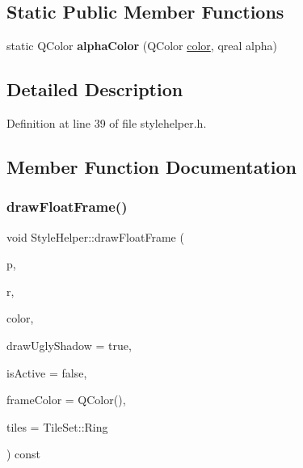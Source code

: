 \subsection*{Static Public Member Functions}
\begin{DoxyCompactItemize}
\item 
\mbox{\label{class_style_helper_a3c869e1c5e95a2c5cbdc9dc0a4b15bbd}} 
static Q\+Color {\bfseries alpha\+Color} (Q\+Color \hyperlink{structcolor}{color}, qreal alpha)
\end{DoxyCompactItemize}


\subsection{Detailed Description}


Definition at line 39 of file stylehelper.\+h.



\subsection{Member Function Documentation}
\mbox{\label{class_style_helper_a04574a2abfcca78015d76c4dfe10ef35}} 
\subsubsection{\texorpdfstring{draw\+Float\+Frame()}{drawFloatFrame()}}
{\footnotesize\ttfamily void Style\+Helper\+::draw\+Float\+Frame (\begin{DoxyParamCaption}\item[{Q\+Painter $\ast$}]{p,  }\item[{const Q\+Rect}]{r,  }\item[{const Q\+Color \&}]{color,  }\item[{bool}]{draw\+Ugly\+Shadow = {\ttfamily true},  }\item[{bool}]{is\+Active = {\ttfamily false},  }\item[{const Q\+Color \&}]{frame\+Color = {\ttfamily QColor()},  }\item[{Tile\+Set\+::\+Tiles}]{tiles = {\ttfamily TileSet\+:\+:Ring} }\end{DoxyParamCaption}) const}



